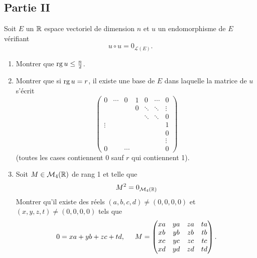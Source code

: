 \subsection*{Partie II}
Soit $E$ un $\mathbb{R}$ espace vectoriel de dimension $n$ et $u$ un endomorphisme de $E$ vérifiant
\[u\circ u = 0_{\mathcal{L}(E)}.\]
\begin{enumerate}
\item Montrer que $\operatorname{rg} u \leq \frac{n}{2}$.
\item Montrer que si $\operatorname{rg} u =r$, il existe une base de $E$ dans laquelle la matrice de $u$ s'écrit
\[
\begin{pmatrix}
0       & \cdots & 0        & 1 & 0       & \cdots  & 0 \\ 
        &        &          & 0 &  \ddots & \ddots  & \vdots \\ 
        &        &          &   &  \ddots & \ddots  & 0 \\ 
\vdots  &        &          &   &         &         & 1 \\ 
        &        &          &   &         &         & 0 \\ 
        &        &          &   &         &         & \vdots \\ 
0       &        & \cdots   &   &         &         & 0
\end{pmatrix}
\]
(toutes les cases contiennent 0 sauf $r$ qui contiennent 1).
\item Soit $M\in \mathcal{M}_{4}(\mathbb{R})$ de rang 1 et telle que 
\[M^2=0_{\mathcal{M}_{4}(\mathbb{R})}\]
Montrer qu'il existe des réels $(a,b,c,d)\neq (0,0,0,0)$ et $(x,y,z,t)\neq (0,0,0,0)$ tels que
\[
0 = xa+yb+zc+td, \hspace{0.5cm}
M = 
\begin{pmatrix}
xa & ya & za & ta \\
xb & yb & zb & tb \\
xc & yc & zc & tc \\
xd & yd & zd & td
\end{pmatrix}.
\]
 
\end{enumerate}

